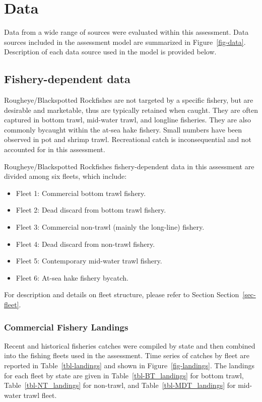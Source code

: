 \documentclass[
]{scrartcl}
\providecommand{\tightlist}{%
  \setlength{\itemsep}{0pt}\setlength{\parskip}{0pt}}\usepackage{longtable,booktabs,array}
\begin{document}
\newpage{}

\section{Data}\label{data}

Data from a wide range of sources were evaluated within this assessment.
Data sources included in the assessment model are summarized in
Figure~\ref{fig-data}. Description of each data source used in the model
is provided below.

\subsection{Fishery-dependent data}\label{sec-fishery_data}

Rougheye/Blackspotted Rockfishes are not targeted by a specific fishery,
but are desirable and marketable, thus are typically retained when
caught. They are often captured in bottom trawl, mid-water trawl, and
longline fisheries. They are also commonly bycaught within the at-sea
hake fishery. Small numbers have been observed in pot and shrimp trawl.
Recreational catch is inconsequential and not accounted for in this
assessment.

Rougheye/Blackspotted Rockfishes fishery-dependent data in this
assessment are divided among six fleets, which include:

\begin{itemize}
\tightlist
\item
  Fleet 1: Commercial bottom trawl fishery.
\item
  Fleet 2: Dead discard from bottom trawl fishery.
\item
  Fleet 3: Commercial non-trawl (mainly the long-line) fishery.
\item
  Fleet 4: Dead discard from non-trawl fishery.
\item
  Fleet 5: Contemporary mid-water trawl fishery.
\item
  Fleet 6: At-sea hake fishery bycatch.
\end{itemize}

For description and details on fleet structure, please refer to Section
Section~\ref{sec-fleet}.

\subsubsection{Commercial Fishery
Landings}\label{commercial-fishery-landings}

Recent and historical fisheries catches were compiled by state and then
combined into the fishing fleets used in the assessment. Time series of
catches by fleet are reported in Table~\ref{tbl-landings} and shown in
Figure~\ref{fig-landings}. The landings for each fleet by state are
given in Table~\ref{tbl-BT_landings} for bottom trawl,
Table~\ref{tbl-NT_landings} for non-trawl, and
Table~\ref{tbl-MDT_landings} for mid-water trawl fleet.
\end{document}
